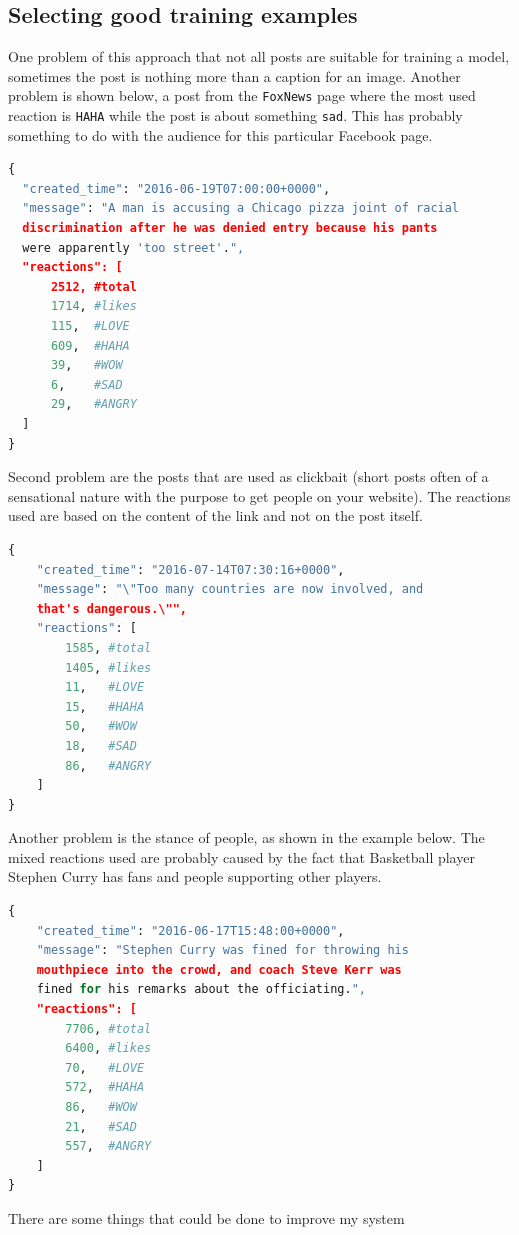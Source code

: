 \documentclass[11pt]{article}
\begin{document}
\subsection{Selecting good training examples}
One problem of this approach that not all posts are suitable for training a model, sometimes the post is nothing more than a caption for an image. Another problem is shown below, a post from the \texttt{FoxNews} page where the most used reaction is \texttt{HAHA} while the post is about something \texttt{sad}. This has probably something to do with the audience for this particular Facebook page.
\begin{lstlisting}[language=Python, caption="Example post"]
{
  "created_time": "2016-06-19T07:00:00+0000",
  "message": "A man is accusing a Chicago pizza joint of racial
  discrimination after he was denied entry because his pants
  were apparently 'too street'.",
  "reactions": [
      2512, #total
      1714, #likes
      115,  #LOVE
      609,  #HAHA
      39,   #WOW
      6,    #SAD
      29,   #ANGRY
  ]
}
\end{lstlisting}
Second problem are the posts that are used as clickbait (short posts often of a sensational nature with the purpose to get people on your website). The reactions used are based on the content of the link and not on the post itself.
\begin{lstlisting}[language=Python, caption="Example post"]
{
    "created_time": "2016-07-14T07:30:16+0000",
    "message": "\"Too many countries are now involved, and 
    that's dangerous.\"",
    "reactions": [
        1585, #total
        1405, #likes
        11,   #LOVE
        15,	  #HAHA
        50,   #WOW
        18,   #SAD
        86,   #ANGRY
    ]
}
\end{lstlisting}
Another problem is the stance of people, as shown in the example below. The mixed reactions used are probably caused by the fact that Basketball player Stephen Curry has fans and people supporting other players.
\begin{lstlisting}[language=Python, caption="Example post"]
{
    "created_time": "2016-06-17T15:48:00+0000",
    "message": "Stephen Curry was fined for throwing his
    mouthpiece into the crowd, and coach Steve Kerr was 
    fined for his remarks about the officiating.",
    "reactions": [
        7706, #total
        6400, #likes
        70,   #LOVE
        572,  #HAHA
        86,   #WOW
        21,   #SAD
        557,  #ANGRY
    ]
}
\end{lstlisting}
There are some things that could be done to improve my system
\end{document}
